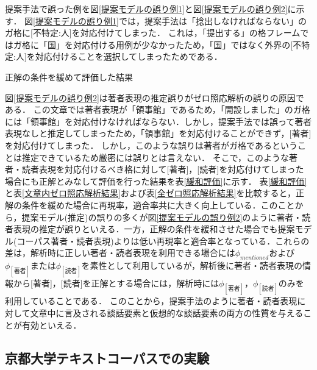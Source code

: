 \documentclass[japanese]{jnlp_1.4}
\begin{document}
提案手法で誤った例を図\ref{提案モデルの誤り例1}と図\ref{提案モデルの誤り例2}に示す．
図\ref{提案モデルの誤り例1}では，提案手法は「捻出しなければならない」のガ格に[不特定:人]を対応付けてしまった．
\pagebreak
これは，「提出する」の格フレームではガ格に「国」を対応付ける用例が少なかったため，「国」ではなく外界の[不特定:人]を対応付けることを選択してしまったためである．

\begin{table}[t]
\caption{正解の条件を緩めて評価した結果}
\label{緩和評価}

\end{table}

図\ref{提案モデルの誤り例2}は著者表現の推定誤りがゼロ照応解析の誤りの原因である．
この文章では著者表現が「領事館」であるため，「開設しました」のガ格には「領事館」を対応付けなければならない．しかし，提案手法では誤って著者表現なしと推定してしまったため，「領事館」を対応付けることができず，[著者]を対応付けてしまった．
しかし，このような誤りは著者がガ格であるということは推定できているため厳密には誤りとは言えない．
そこで，このような著者・読者表現を対応付けるべき格に対して[著者]，[読者]を対応付けてしまった場合にも正解とみなして評価を行った結果を表\ref{緩和評価}に示す．
表\ref{緩和評価}と表\ref{文章内ゼロ照応解析結果}および表\ref{全ゼロ照応解析結果}を比較すると，正解の条件を緩めた場合に再現率，適合率共に大きく向上している．このことから，提案モデル(推定)の誤りの多くが図\ref{提案モデルの誤り例2}のように著者・読者表現の推定が誤りといえる．一方，正解の条件を緩和させた場合でも提案モデル(コーパス著者・読者表現)よりは低い再現率と適合率となっている．これらの差は，解析時に正しい著者・読者表現を利用できる場合には$\phi_\mathit{mentioned}$および$\phi_{[著者]}$または$\phi_{[読者]}$を素性として利用しているが，解析後に著者・読者表現の情報から[著者]，[読者]を正解とする場合には，解析時には$\phi_{[著者]}$，$\phi_{[読者]}$のみを利用していることである．
このことから，提案手法のように著者・読者表現に対して文章中に言及される談話要素と仮想的な談話要素の両方の性質を与えることが有効といえる．




\subsection{京都大学テキストコーパスでの実験}
\end{document}
